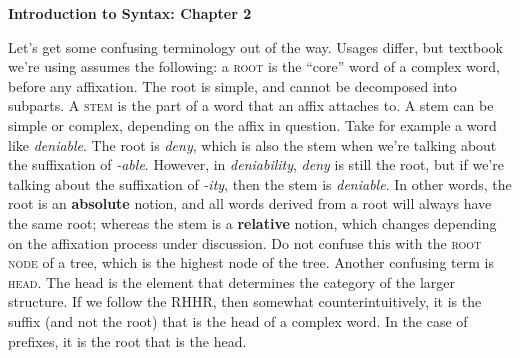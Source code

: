 \documentclass[a4paper,12pt]{article}
\begin{document}
\noindent\textbf{Introduction to Syntax: Chapter 2}\par
\noindent Let's get some confusing terminology out of the way. Usages differ, but textbook we're using assumes the following: a \textsc{root} is the ``core'' word of a complex word, before any affixation. The root is simple, and cannot be decomposed into subparts. A \textsc{stem} is the part of a word that an affix attaches to. A stem can be simple or complex, depending on the affix in question. Take for example a word like \textit{deniable}. The root is \textit{deny}, which is also the stem when we're talking about the suffixation of \textit{-able}. However, in \textit{deniability}, \textit{deny} is still the root, but if we're talking about the suffixation of \textit{-ity}, then the stem is \textit{deniable}. In other words, the root is an \textbf{absolute} notion, and all words derived from a root will always have the same root; whereas the stem is a \textbf{relative} notion, which changes depending on the affixation process under discussion. Do not confuse this with the \textsc{root node} of a tree, which is the highest node of the tree. Another confusing term is \textsc{head}. The head is the element that determines the category of the larger structure. If we follow the RHHR, then somewhat counterintuitively, it is the suffix (and not the root) that is the head of a complex word. In the case of prefixes, it is the root that is the head.

\hspace{1em}
\end{document}
